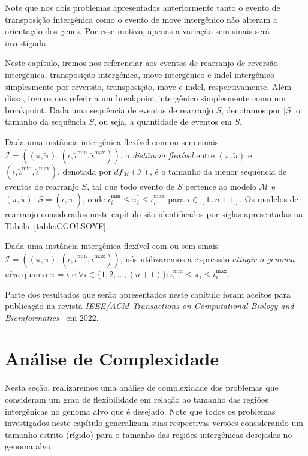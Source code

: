 Note que nos dois problemas apresentados anteriormente tanto o evento de transposição intergênica como o evento de move intergênico não alteram a orientação dos genes. Por esse motivo, apenas a variação sem sinais será investigada.

Neste capítulo, iremos nos referenciar aos eventos de rearranjo de reversão intergênica, transposição intergênica, move intergênico e indel intergênico simplesmente por reversão, transposição, move e indel, respectivamente. Além disso, iremos nos referir a um breakpoint intergênico simplesmente como um breakpoint. Dada uma sequência de eventos de rearranjo $S$, denotamos por $|S|$ o tamanho da sequência $S$, ou seja, a quantidade de eventos em $S$.

Dada uma instância intergênica flexível com ou sem sinais $\mathcal{I} = ((\pi,\breve\pi),(\iota,\breve\iota^{\min},\breve\iota^{\max}))$, a \emph{distância flexível} entre $(\pi,\breve\pi)$ e $(\iota,\breve\iota^{\min},\breve\iota^{\max})$, denotada por $df_{\mathcal{M}}(\mathcal{I})$, é o tamanho da menor sequência de eventos de rearranjo $S$, tal que todo evento de $S$ pertence ao modelo $\mathcal{M}$ e $(\pi,\breve\pi) \cdot S = (\iota,\breve\pi^{\prime})$, onde $\breve\iota^{\min}_i \le \breve\pi^{\prime}_i \le \breve\iota^{\max}_i$ para $i \in [1..n+1]$. Os modelos de rearranjo considerados neste capítulo são identificados por siglas apresentadas na Tabela~\ref{table:CGOLSOYF}.



Dada uma instância intergênica flexível com ou sem sinais $\mathcal{I} = ((\pi,\breve\pi),(\iota,\breve\iota^{\min},\breve\iota^{\max}))$, nós utilizaremos a expressão \emph{atingir o genoma alvo} quanto $\pi = \iota$ e $\forall i \in \{1,2,\dots,({n+1})\}: \breve\iota^{\min}_i \le \breve\pi_i \le \breve\iota^{\max}_i$.

Parte dos resultados que serão apresentados neste capítulo foram aceitos para publicação na revista \emph{IEEE/ACM Transactions on Computational Biology and Bioinformatics}~\cite{2022a-brito-etal} em 2022.

\section{Análise de Complexidade}

Nesta seção, realizaremos uma análise de complexidade dos problemas que consideram um grau de flexibilidade em relação ao tamanho das regiões intergênicas no genoma alvo que é desejado. Note que todos os problemas investigados neste capítulo generalizam suas respectivas versões considerando um tamanho estrito (rígido) para o tamanho das regiões intergênicas desejadas no genoma alvo.

